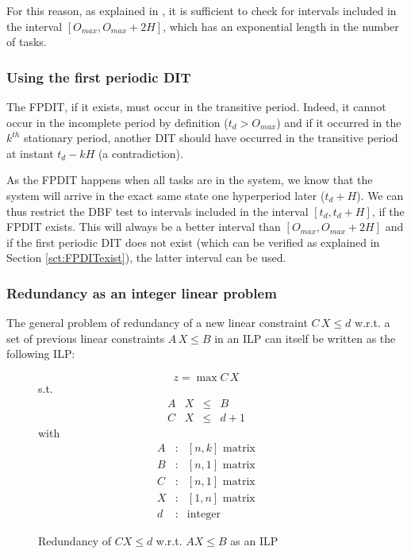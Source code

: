 \documentclass[conference]{IEEEtran}
\begin{document}
For this reason, as explained in \cite{leung1982complexity}, it is sufficient to check for intervals included in the interval $[O_{max}, O_{max} + 2H]$, which has an exponential length in the number of tasks.

\subsubsection{Using the first periodic DIT}

The FPDIT, if it exists, must occur in the transitive period. Indeed, it cannot occur in the incomplete period by definition ($t_d > O_{max}$) and if it occurred in the $k^{th}$ stationary period, another DIT should have occurred in the transitive period at instant $t_d - k H$ (a contradiction).

As the FPDIT happens when all tasks are in the system, we know that the system will arrive in the exact same state one hyperperiod later ($t_d + H$). We can thus restrict the DBF test to intervals included in the interval $[t_d, t_d + H]$, if the FPDIT exists. This will always be a better interval than $[O_{max}, O_{max} + 2H]$ and if the first periodic DIT does not exist (which can be verified as explained in Section \ref{sct:FPDITexist}), the latter interval can be used.

\subsubsection{Redundancy as an integer linear problem}

The general problem of redundancy of a new linear constraint $C \, X \leq d$ w.r.t. a set of previous linear constraints $A \, X \leq B$ in an ILP can itself be written as the following ILP:

\begin{figure}[h]
$$z = \max C \, X$$
s.t.
\[
\begin{array}{rccc}
  A & X &\leq & B \\
  C & X &\leq & d + 1
\end{array}
\]
with
\[
  \begin{array}{ccc}
    A & : & [n,k] \text{ matrix}\\
    B & : & [n,1] \text{ matrix}\\
    C & : & [n,1] \text{ matrix}\\
    X & : & [1,n] \text{ matrix}\\
    d & : & \text{integer}
  \end{array}
\]
\caption{Redundancy of $CX \leq d$ w.r.t. $A X \leq B$ as an ILP}
\end{figure}
\end{document}
